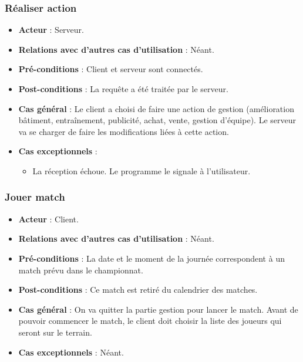 \documentclass[a4paper,titlepage]{scrreprt}
\begin{document}
    \subsubsection{Réaliser action}
      \begin{itemize}
        \item \textbf{Acteur}  : Serveur.
        \item \textbf{Relations avec d'autres cas d'utilisation}  : Néant.
        \item \textbf{Pré-conditions} : Client et serveur sont connectés.
        \item \textbf{Post-conditions} : La requête a été traitée par le serveur.
        \item \textbf{Cas général} : Le client a choisi de faire une action de gestion (amélioration bâtiment, entraînement, publicité, achat, vente, gestion d’équipe). Le serveur va se charger de faire les modifications liées à cette action.
        \item \textbf{Cas exceptionnels} :
        \begin{itemize}
            \item La réception échoue. Le programme le signale à l'utilisateur.
          \end{itemize} 
      \end{itemize}
    \subsubsection{Jouer match}
      \begin{itemize}
        \item \textbf{Acteur}  : Client.
        \item \textbf{Relations avec d'autres cas d'utilisation}  : Néant.
        \item \textbf{Pré-conditions} : La date et le moment de la journée correspondent à un match prévu dans le championnat.
        \item \textbf{Post-conditions} : Ce match est retiré du \gls{calendrier} des matches.
        \item \textbf{Cas général} : On va quitter la partie gestion pour lancer le match. Avant de pouvoir commencer le match, le client doit choisir la liste des joueurs qui seront sur le terrain. 
        \item \textbf{Cas exceptionnels} : Néant.
      \end{itemize}
\end{document}
